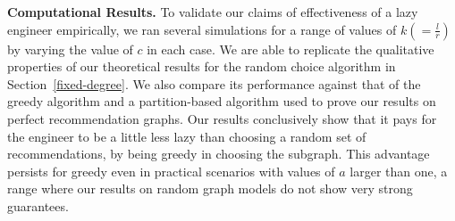 \noindent
{\bf Computational Results.} 
To validate our claims of effectiveness of a lazy engineer empirically, we ran several simulations for a range of values of $k (= \frac{l}{r})$ by varying the value of $c$ in each case. We are able to replicate the qualitative properties of our theoretical results for the random choice algorithm in Section~\ref{fixed-degree}. We also compare its performance against that of the greedy algorithm and a partition-based algorithm used to prove our results on perfect recommendation graphs. Our results conclusively show that it pays for the engineer to be a little less lazy than choosing a random set of recommendations, by being greedy in choosing the subgraph. This advantage persists for greedy even in practical scenarios with values of $a$ larger than one, a range where our results on random graph models do not show very strong guarantees. \vs


